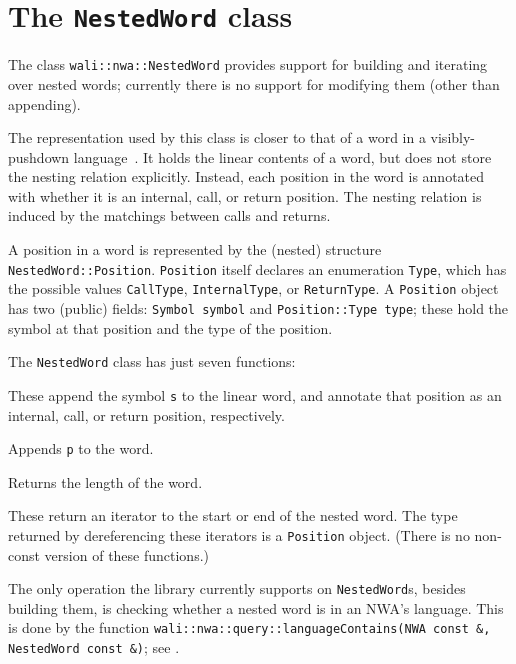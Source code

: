 \section{The \texttt{NestedWord} class}
\label{Se:class-nested-word}

The class \texttt{wali::nwa::NestedWord} provides support for
building and iterating over nested words; currently there
is no support for modifying them (other than appending).

The representation used by this class is closer to that of a word in a
visibly-pushdown language~\cite{JACM:AM2009}. It holds the linear contents of
a word, but does not store the nesting relation explicitly. Instead, each
position in the word is annotated with whether it is an internal, call, or
return position. The nesting relation is induced by the matchings between
calls and returns.

A position in a word is represented by the (nested) structure
\texttt{NestedWord::Position}. \texttt{Position} itself declares an
enumeration \texttt{Type}, which has the possible values \texttt{CallType},
\texttt{InternalType}, or \texttt{ReturnType}.
A \texttt{Position} object has two (public) fields: \texttt{Symbol symbol}
and \texttt{Position::Type type}; these hold the symbol at that position and
the type of the position.


The \texttt{NestedWord} class has just seven functions:
\begin{functionlist}
    These append the symbol \texttt{s} to the linear word, and annotate that
    position as an internal, call, or return position, respectively.

    Appends \texttt{p} to the word.

    Returns the length of the word.

    These return an iterator to the start or end
    of the nested word. The type returned by dereferencing these iterators is
    a \texttt{Position} object. (There is no non-const version of these
    functions.)
\end{functionlist}

The only operation the library currently supports on
\texttt{NestedWord}s, besides building them, is checking whether a
nested word is in an NWA's language. This is done by
the function \texttt{wali::nwa::query::languageContains(\mbox{NWA const \&}, \mbox{NestedWord const \&})}; see
.

